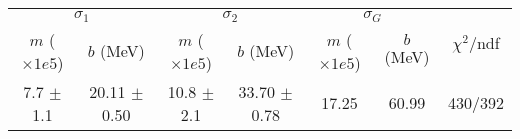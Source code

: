 \begin{tabular}{cc|cc|cc||c}
\multicolumn{2}{c|}{$\sigma_1$} & \multicolumn{2}{|c}{$\sigma_2$} & \multicolumn{2}{|c}{$\sigma_G$}  & \multirow{2}{*}{$\chi^2/$ndf}\\
$m$ ($\times1e5$) & $b$ (MeV) & $m$ ($\times1e5$) & $b$ (MeV) & $m$ ($\times1e5$) & $b$ (MeV) & \\
\hline
7.7 $\pm$ 1.1 & 20.11 $\pm$ 0.50 & 10.8 $\pm$ 2.1 & 33.70 $\pm$ 0.78 & 17.25 & 60.99 & 430/392\\
\end{tabular}
